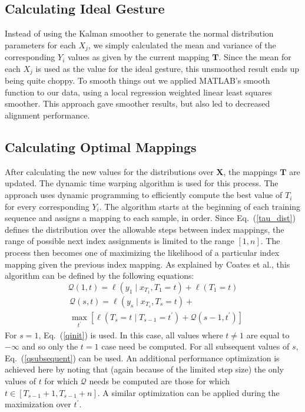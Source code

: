 \documentclass{article}
\begin{document}
\subsection{Calculating Ideal Gesture}

Instead of using the Kalman smoother to generate the normal distribution parameters
for each $X_j$, we simply calculated the mean and variance of the corresponding
$Y_i$ values as given by the current mapping $\mathbf{T}$. Since the mean for each
$X_j$ is used as the value for the ideal gesture, this unsmoothed result ends up being
quite choppy. To smooth things out we applied MATLAB's smooth function to our data,
using a local regression weighted linear least squares smoother. This approach gave
smoother results, but also led to decreased alignment performance.

\subsection{Calculating Optimal Mappings}

After calculating the new values for the distributions over $\mathbf{X}$, the mappings
$\mathbf{T}$ are updated. The dynamic time warping algorithm is used for this
process. The approach uses dynamic programming to efficiently compute the best
value of $T_i$ for every corresponding $Y_i$. The algorithm starts at the beginning
of each training sequence and assigns a mapping to each sample, in order. Since
Eq.\ (\ref{tau_dist}) defines the distribution over the allowable steps between
index mappings, the range of possible next index assignments is limited to the range
$\left[1,n\right]$. The process then becomes one of maximizing the likelihood of a
particular index mapping given the previous index mapping. As explained by Coates
et al., this algorithm can be defined by the following equations:
\begin{equation}
\label{qinit}
\mathcal{Q}\left(1,t\right)=\ell\left(y_1 \mid x_{T_1}, T_1=t\right)+\ell\left(T_1=t\right)
\end{equation}
\begin{equation}
\label{qsubsequent}
\begin{split}
&\mathcal{Q}\left(s,t\right) = \ell\left(y_s \mid x_{T_s}, T_s=t\right)+\\
&\max_{t^\prime}\left[\ell\left(T_s=t\mid T_{s-1}=t^\prime\right)+\mathcal{Q}\left(s-1,t^\prime\right)\right]
\end{split}
\end{equation}
For $s=1$, Eq.\ (\ref{qinit}) is used. In this case, all values where $t\neq1$ are
equal to $-\infty$ and so only the $t=1$ case need be computed. For all subsequent
values of $s$, Eq.\ (\ref{qsubsequent}) can be used. An additional performance
optimization is achieved here by noting that (again because of the limited step size)
the only values of $t$ for which $\mathcal{Q}$ needs be computed are those for which
$t\in\left[T_{s-1}+1,T_{s-1}+n\right]$. A similar optimization can be applied during the
maximization over $t^\prime$.
\end{document}
